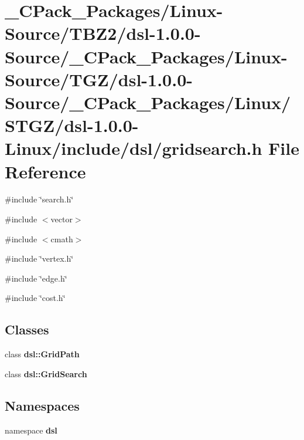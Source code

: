 \section{\_\-CPack\_\-Packages/Linux-\/Source/TBZ2/dsl-\/1.0.0-\/Source/\_\-CPack\_\-Packages/Linux-\/Source/TGZ/dsl-\/1.0.0-\/Source/\_\-CPack\_\-Packages/Linux/STGZ/dsl-\/1.0.0-\/Linux/include/dsl/gridsearch.h File Reference}
\label{__CPack__Packages_2Linux-Source_2TBZ2_2dsl-1_80_80-Source_2__CPack__Packages_2Linux-Source_2TGZ_23ad10c8579e3c8e7af6ccd7dbd84476}
{\ttfamily \#include \char`\"{}search.h\char`\"{}}\par
{\ttfamily \#include $<$vector$>$}\par
{\ttfamily \#include $<$cmath$>$}\par
{\ttfamily \#include \char`\"{}vertex.h\char`\"{}}\par
{\ttfamily \#include \char`\"{}edge.h\char`\"{}}\par
{\ttfamily \#include \char`\"{}cost.h\char`\"{}}\par
\subsection*{Classes}
\begin{DoxyCompactItemize}
\item 
class {\bf dsl::GridPath}
\item 
class {\bf dsl::GridSearch}
\end{DoxyCompactItemize}
\subsection*{Namespaces}
\begin{DoxyCompactItemize}
\item 
namespace {\bf dsl}
\end{DoxyCompactItemize}
